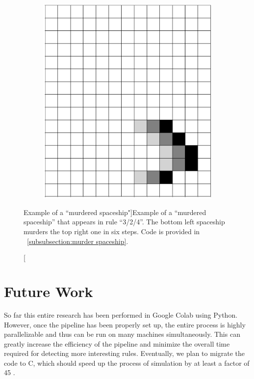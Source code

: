 \documentclass[12pt]{article}
\numberwithin{figure}{section} %
\begin{document}
\begin{figure}[H]
\begin{subfigure}{0.24\textwidth}
     		\subcaption{}
   	\end{subfigure}
	\begin{subfigure}{0.24\textwidth}
     		\includegraphics[width=\linewidth]{Section4/36.6}
     		\subcaption{}
   	\end{subfigure}
   \caption[Example of a “murdered spaceship"]{Example of a “murdered spaceship” that appears in rule “3/2/4”. The bottom left spaceship murders the top right one in six steps. Code is provided in ~\ref{subsubsection:murder spaceship}.}
   \label{fig:murder spaceship}
\end{figure}

\newpage
\section{Future Work}
\label{Future Work}
So far this entire research has been performed in Google Colab using Python. However, once the pipeline has been properly set up, the entire process is highly parallelizable and thus can be run on many machines simultaneously. This can greatly increase the efficiency of the pipeline and minimize the overall time required for detecting more interesting rules. Eventually, we plan to migrate the code to C, which should speed up the process of simulation by at least a factor of 45 \cite{c}. 
\end{document}
